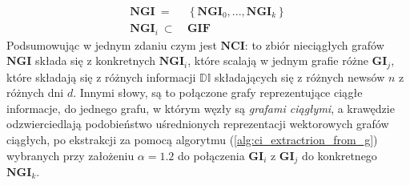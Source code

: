 \begin{equation}
    \label{eq:def_abstract_ngi}
    \begin{aligned}
        \mathbf{NGI} \: = \: &
        \left\{ 
            \mathbf{NGI}_0, ..., \mathbf{NGI}_k
        \right\}
        \\
        \mathbf{NGI}_i \: \subset  \: & \mathbf{GIF}
    \end{aligned}
\end{equation}
Podsumowując w jednym zdaniu czym jest $\textbf{NCI}$:
to zbiór nieciągłych grafów $\mathbf{NGI}$ 
składa się z konkretnych $\mathbf{NGI}_i$,
które scalają w jednym grafie różne $\mathbf{GI}_j$, 
które składają się z różnych informacji $\mathbb{DI}$ 
składających się z różnych newsów $n$ z różnych dni $d$.
Innymi słowy, są to połączone grafy reprezentujące ciągłe informacje,
do jednego grafu, w którym węzły są \textit{grafami ciągłymi}, a krawędzie
odzwierciedlają podobieństwo uśrednionych reprezentacji wektorowych grafów
ciągłych, po ekstrakcji za pomocą algorytmu (\ref{alg:ci_extractrion_from_g})
wybranych przy założeniu $\alpha = 1.2$ do połączenia $\mathbf{GI}_i$ z $\mathbf{GI}_j$
do konkretnego $\mathbf{NGI}_k$.